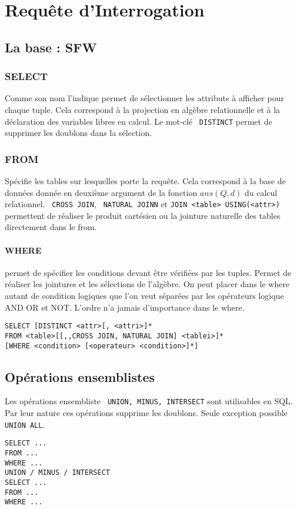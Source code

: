 \documentclass[10pt,a4paper,twoside]{article}
\begin{document}
\section{Requête d'Interrogation}
\subsection{La base : SFW}
\subsubsection{SELECT} 
Comme son nom l'indique permet de sélectionner les attributs à afficher pour chaque tuple. Cela correspond à la projection en algèbre relationnelle et à la déclaration des variables libres en calcul. Le mot-clé \verb= DISTINCT= permet de supprimer les doublons dans la sélection.

\subsubsection{FROM} 
Spécifie les tables sur lesquelles porte la requête. Cela correspond à la base de données donnée en deuxième argument de la fonction $ans(Q,d)$ du calcul relationnel. \verb= CROSS JOIN=, \verb= NATURAL JOINN= et \verb=JOIN <table> USING(<attr>)= permettent de réaliser le produit cartésien ou la jointure naturelle des tables directement dans le from.

\paragraph{WHERE} permet de spécifier les conditions devant être vérifiées par les tuples. Permet de réaliser les jointures et les sélections de l'algèbre. On peut placer dans le where autant de condition logiques que l'on veut séparées par les opérateurs logique AND OR et NOT. L'ordre n'a jamais d'importance dans le where.

\begin{verbatim}
SELECT [DISTINCT <attr>[, <attri>]*
FROM <table>[[,,CROSS JOIN, NATURAL JOIN] <tablei>]*
[WHERE <condition> [<operateur> <condition>]*]
\end{verbatim}

\subsection{Opérations ensemblistes}
Les opérations ensembliste \verb= UNION, MINUS, INTERSECT= sont utilisables en SQL. Par leur nature ces opérations supprime les doublons. Seule exception possible \verb= UNION ALL=.
\begin{verbatim}
SELECT ...
FROM ...
WHERE ...
UNION / MINUS / INTERSECT
SELECT ...
FROM ...
WHERE ...
\end{verbatim}
\end{document}
